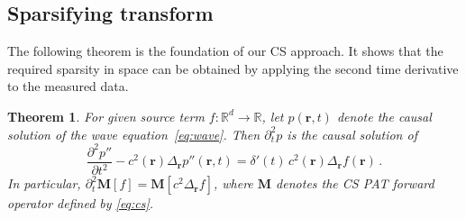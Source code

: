 \documentclass[11pt]{article}
\newcommand{\rr}{\mathbf r}
\newcommand{\source}{f}
\newcommand{\R}{\mathbb R}
\newcommand{\fullop}{\mathbf M}
\newtheorem{theorem}{Theorem}[section]
\begin{document}

\subsection{Sparsifying transform}

The following theorem is the foundation
of our CS  approach.
It shows that the required sparsity
in space can be  obtained by applying the
second time derivative to the measured data.

\begin{theorem} \label{thm:laplace}
	For given source term $\source \colon \R^d \to \R$,  let  $p(\rr,t)$ denote the causal
	solution of the wave equation~\eqref{eq:wave}.  Then  $\partial_t^2 p$  is the
	causal solution of
	\begin{equation} \label{eq:wave2}
	\frac{\partial^2 p''}{\partial t^2}  -  c^2 (\rr)  \Delta_\rr p'' (\rr, t)  =
	\delta'(t) \,  c^2(\rr) \Delta_{\rr} \source (\rr) \,.
	\end{equation}
	In particular, $\partial_t^2 \fullop  [\source] = \fullop  [c^2 \Delta_{\rr} \source]$,
	where $\fullop$ denotes the CS PAT forward  operator defined
	by \eqref{eq:cs}.
\end{theorem}
\end{document}
